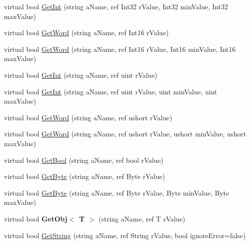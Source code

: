 \begin{DoxyCompactItemize}
virtual bool \mbox{\hyperlink{class_t_net_1_1_service_1_1_action_getter_a5e4ca4b5e0cd7bfcf76f96b6b546554a}{Get\+Int}} (string a\+Name, ref Int32 r\+Value, Int32 min\+Value, Int32 max\+Value)
\item 
virtual bool \mbox{\hyperlink{class_t_net_1_1_service_1_1_action_getter_a7467c66b18a80f2eb51e936864f0a80a}{Get\+Word}} (string a\+Name, ref Int16 r\+Value)
\item 
virtual bool \mbox{\hyperlink{class_t_net_1_1_service_1_1_action_getter_a180654258e018584f5148e4e5f945105}{Get\+Word}} (string a\+Name, ref Int16 r\+Value, Int16 min\+Value, Int16 max\+Value)
\item 
virtual bool \mbox{\hyperlink{class_t_net_1_1_service_1_1_action_getter_af1ffcdde2c5c28dc8171ae816fb1aa25}{Get\+Int}} (string a\+Name, ref uint r\+Value)
\item 
virtual bool \mbox{\hyperlink{class_t_net_1_1_service_1_1_action_getter_a32dcd451275e8f7fe20e711ceac96f4b}{Get\+Int}} (string a\+Name, ref uint r\+Value, uint min\+Value, uint max\+Value)
\item 
virtual bool \mbox{\hyperlink{class_t_net_1_1_service_1_1_action_getter_a9709d8667c0ba20a6f1dd3e2141ea61d}{Get\+Word}} (string a\+Name, ref ushort r\+Value)
\item 
virtual bool \mbox{\hyperlink{class_t_net_1_1_service_1_1_action_getter_a5ef686fe56be0128c3232df533d88580}{Get\+Word}} (string a\+Name, ref ushort r\+Value, ushort min\+Value, ushort max\+Value)
\item 
virtual bool \mbox{\hyperlink{class_t_net_1_1_service_1_1_action_getter_aff9d7973b2f74986eeec110c5b2a273f}{Get\+Bool}} (string a\+Name, ref bool r\+Value)
\item 
virtual bool \mbox{\hyperlink{class_t_net_1_1_service_1_1_action_getter_a3f5ed08dbd854214ed136221ea4f113e}{Get\+Byte}} (string a\+Name, ref Byte r\+Value)
\item 
virtual bool \mbox{\hyperlink{class_t_net_1_1_service_1_1_action_getter_a358fcc217a92681c14c8e8d3e59f2dfb}{Get\+Byte}} (string a\+Name, ref Byte r\+Value, Byte min\+Value, Byte max\+Value)
\item 
\mbox{\label{class_t_net_1_1_service_1_1_action_getter_a9ef1db305ccb8cda3f960f86f02e5e7a}} 
virtual bool {\bfseries Get\+Obj$<$ T $>$} (string a\+Name, ref T r\+Value)
\item 
virtual bool \mbox{\hyperlink{class_t_net_1_1_service_1_1_action_getter_a09c7de090a7b441f098183a20e6afa72}{Get\+String}} (string a\+Name, ref String r\+Value, bool ignore\+Error=false)

\end{DoxyCompactItemize}
